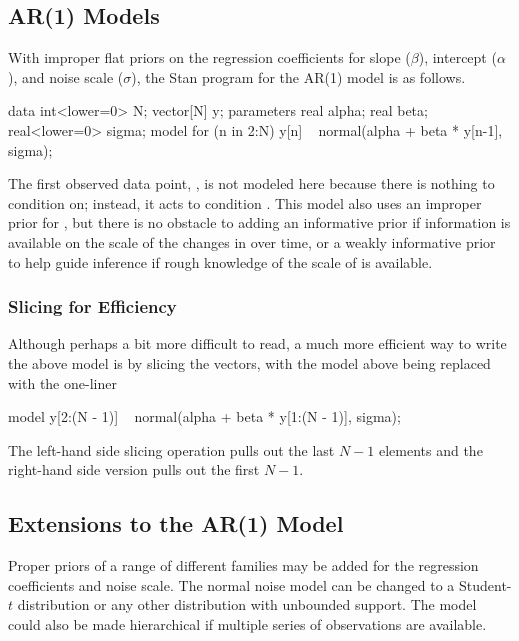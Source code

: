 \subsection{AR(1) Models}

With improper flat priors on the regression coefficients for slope
($\beta$), intercept ($\alpha$), and noise scale ($\sigma$),
the Stan program for the AR(1) model is as follows.
%
\begin{stancode}
data {
  int<lower=0> N;
  vector[N] y;
}
parameters {
  real alpha;
  real beta;
  real<lower=0> sigma;
}
model {
  for (n in 2:N)
    y[n] ~ normal(alpha + beta * y[n-1], sigma);
}
\end{stancode}
%
The first observed data point, , is not modeled here
because there is nothing to condition on; instead, it acts to
condition .  This model also uses an improper prior for
, but there is no obstacle to adding an informative prior
if information is available on the scale of the changes in 
over time, or a weakly informative prior to help guide inference if
rough knowledge of the scale of  is available.

\subsubsection{Slicing for Efficiency}

Although perhaps a bit more difficult to read, a much more efficient
way to write the above model is by slicing the vectors, with the model
above being replaced with the one-liner
%
\begin{stancode}
model {
  y[2:(N - 1)] ~ normal(alpha + beta * y[1:(N - 1)], sigma);
}
\end{stancode}
%
The left-hand side slicing operation pulls out the last $N-1$
elements and the right-hand side version pulls out the first $N-1$.



\subsection{Extensions to the AR(1) Model} 

Proper priors of a range of different families may be added for the
regression coefficients and noise scale.  The normal noise model can
be changed to a Student-$t$ distribution or any other distribution
with unbounded support.  The model could also be made hierarchical if
multiple series of observations are available.  

